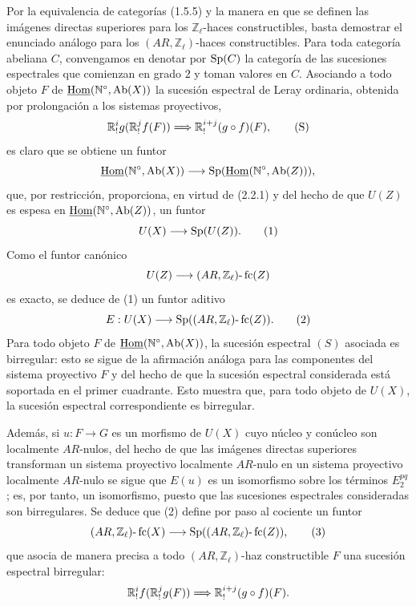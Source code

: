 \begin{prooftext}[Demostración]
Por la equivalencia de categorías (1.5.5) y la manera en que se definen las imágenes directas superiores para los \(\mathbb Z_\ell\)-haces constructibles, basta demostrar el enunciado análogo para los \((AR,\mathbb Z_\ell)\)-haces constructibles. Para toda categoría abeliana \(C\), convengamos en denotar por \(\operatorname{Sp}(C)\) la categoría de las sucesiones espectrales que comienzan en grado \(2\) y toman valores en \(C\). Asociando a todo objeto \(F\) de \(\underline{\operatorname{Hom}}(\mathbb N^\circ,\operatorname{Ab}(X))\) la sucesión espectral de Leray ordinaria, obtenida por prolongación a los sistemas proyectivos,
\[
\mathbb{R}^i_! g(\mathbb{R}^j_! f(F))\Longrightarrow \mathbb{R}^{i+j}_!(g\circ f)(F),
\tag{S}
\]
es claro que se obtiene un funtor
\[
\underline{\operatorname{Hom}}(\mathbb N^\circ,\operatorname{Ab}(X))\longrightarrow \operatorname{Sp}(\underline{\operatorname{Hom}}(\mathbb N^\circ,\operatorname{Ab}(Z))),
\]
que, por restricción, proporciona, en virtud de (2.2.1) y del hecho de que \(U(Z)\) es espesa en \(\underline{\operatorname{Hom}}(\mathbb N^\circ,\operatorname{Ab}(Z))\), un funtor
\[
U(X)\longrightarrow \operatorname{Sp}(U(Z)).
\tag{1}
\]
Como el funtor canónico
\[
U(Z)\longrightarrow (AR,\mathbb Z_\ell)\text{-}\operatorname{fc}(Z)
\]
es exacto, se deduce de (1) un funtor aditivo
\[
E:U(X)\longrightarrow \operatorname{Sp}((AR,\mathbb Z_\ell)\text{-}\operatorname{fc}(Z)).
\tag{2}
\]
Para todo objeto \(F\) de \(\underline{\operatorname{Hom}}(\mathbb N^\circ,\operatorname{Ab}(X))\), la sucesión espectral \((S)\) asociada es birregular: esto se sigue de la afirmación análoga para las componentes del sistema proyectivo \(F\) y del hecho de que la sucesión espectral considerada está soportada en el primer cuadrante. Esto muestra que, para todo objeto de \(U(X)\), la sucesión espectral correspondiente es birregular.

Además, si \(u:F\to G\) es un morfismo de \(U(X)\) cuyo núcleo y conúcleo son localmente \(AR\)-nulos, del hecho de que las imágenes directas superiores transforman un sistema proyectivo localmente \(AR\)-nulo en un sistema proyectivo localmente \(AR\)-nulo se sigue que \(E(u)\) es un isomorfismo sobre los términos \(E_2^{pq}\); es, por tanto, un isomorfismo, puesto que las sucesiones espectrales consideradas son birregulares. Se deduce que (2) define por paso al cociente un funtor
\[
(AR,\mathbb Z_\ell)\text{-}\operatorname{fc}(X)
\longrightarrow \operatorname{Sp}((AR,\mathbb Z_\ell)\text{-}\operatorname{fc}(Z)),
\tag{3}
\]
que asocia de manera precisa a todo \((AR,\mathbb Z_\ell)\)-haz constructible \(F\) una sucesión espectral birregular:
\[
\mathbb{R}^i_!f(\mathbb{R}^j_!g(F))\Longrightarrow \mathbb{R}^{i+j}_!(g\circ f)(F).
\]
\end{prooftext}
